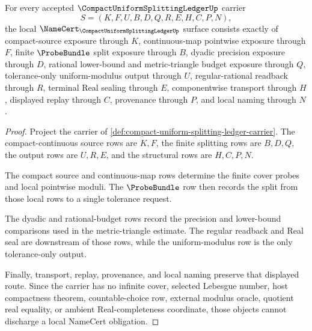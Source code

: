 \begin{theorem}
\label{thm:compact-uniform-splitting-ledger-namecert-obligations}
For every accepted $\CompactUniformSplittingLedgerUp$ carrier
$$
S=(K,F,U,B,D,Q,R,E,H,C,P,N),
$$
the local $\NameCert_{\CompactUniformSplittingLedgerUp}$ surface consists exactly of compact-source exposure through $K$, continuous-map pointwise exposure through $F$, finite $\ProbeBundle$ split exposure through $B$, dyadic precision exposure through $D$, rational lower-bound and metric-triangle budget exposure through $Q$, tolerance-only uniform-modulus output through $U$, regular-rational readback through $R$, terminal Real sealing through $E$, componentwise transport through $H$, displayed replay through $C$, provenance through $P$, and local naming through $N$.
\end{theorem}
\begin{proof}
Project the carrier of \autoref{def:compact-uniform-splitting-ledger-carrier}. The compact-continuous source rows are $K,F$, the finite splitting rows are $B,D,Q$, the output rows are $U,R,E$, and the structural rows are $H,C,P,N$.

The compact source and continuous-map rows determine the finite cover probes and local pointwise moduli. The $\ProbeBundle$ row then records the split from those local rows to a single tolerance request.

The dyadic and rational-budget rows record the precision and lower-bound comparisons used in the metric-triangle estimate. The regular readback and Real seal are downstream of those rows, while the uniform-modulus row is the only tolerance-only output.

Finally, transport, replay, provenance, and local naming preserve that displayed route. Since the carrier has no infinite cover, selected Lebesgue number, host compactness theorem, countable-choice row, external modulus oracle, quotient real equality, or ambient Real-completeness coordinate, those objects cannot discharge a local NameCert obligation.
\end{proof}

